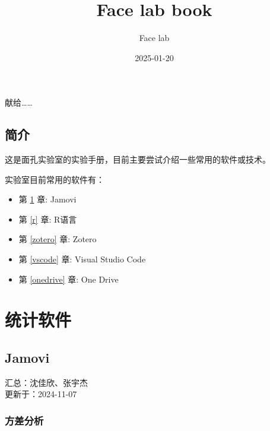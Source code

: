 \documentclass[]{ctexbook}
\title{Face lab book}
\author{Face lab}
\date{2025-01-20}
\providecommand{\tightlist}{%
  \setlength{\itemsep}{0pt}\setlength{\parskip}{0pt}}
\theoremstyle{definition}
\theoremstyle{definition}
\theoremstyle{definition}
\theoremstyle{definition}
\theoremstyle{remark}
\begin{document}
\maketitle


\thispagestyle{empty}

\begin{center}
献给……

\end{center}

\setlength{\abovedisplayskip}{-5pt}
\setlength{\abovedisplayshortskip}{-5pt}

{
\setcounter{tocdepth}{2}
\tableofcontents
}
\listoftables
\listoffigures
\chapter{简介}\label{ux7b80ux4ecb}

这是面孔实验室的实验手册，目前主要尝试介绍一些常用的软件或技术。

实验室目前常用的软件有：

\begin{itemize}
\tightlist
\item
  第 \ref{jamovi} 章: Jamovi\\
\item
  第 \ref{r} 章: R语言\\
\item
  第 \ref{zotero} 章: Zotero
\item
  第 \ref{vscode} 章: Visual Studio Code\\
\item
  第 \ref{onedrive} 章: One Drive
\end{itemize}

\mainmatter

\part{统计软件}\label{part-ux7edfux8ba1ux8f6fux4ef6}

\chapter{Jamovi}\label{jamovi}

汇总：沈佳欣、张宇杰\\
更新于：2024-11-07

\section{方差分析}\label{ux65b9ux5deeux5206ux6790}
\end{document}

